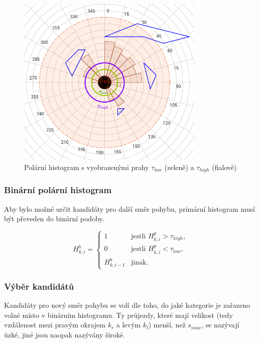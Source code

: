 \documentclass[twoside]{ctuthesis}
\theoremstyle{plain}
\theoremstyle{definition}
\theoremstyle{note}
\begin{document}
\begin{figure}
	\caption{Polární histogram s vyobrazenými prahy $\tau_{low}$ (zeleně) a $\tau_{high}$ (fialově)}

	\label{polar}
	\includegraphics[width=0.8\textwidth]{images/3/polar.png}
\end{figure}
\subsubsection{Binární polární histogram}

Aby bylo možné určit kandidáty pro další směr pohybu, primární histogram musí být převeden do binární podoby.

\begin{equation}
H_{k,i}^{b} = \left\{
\begin{array}{ll}
1&\textrm{jestli $H_{k,i}^p > \tau_{high}$,}\\
0&\textrm{jestli $H_{k,i}^p < \tau_{low}$,}\\
H_{k, i-1}^b&\textrm{jinak.}
\end{array}
\right.
\end{equation}

\subsubsection{Výběr kandidátů}

Kandidáty pro nový směr pohybu se volí dle toho, do jaké kategorie je zařazeno volné místo v binárním histogramu. Ty průjezdy, které mají velikost (tedy vzdálenost mezi pravým okrajem $k_r$ a levým $k_l$) menší, než $s_{max}$, se nazývají úzké, jiné jsou naopak nazývány široké.
\end{document}
